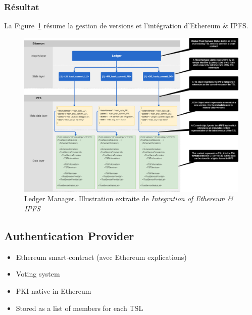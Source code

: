 \documentclass{tnreport}
\begin{document}
\subsubsection{Résultat}

La Figure~\ref{fig:versioning} résume la gestion de versions et l'intégration d'Ethereum \& IPFS.

\clearpage

\begin{figure}[h]
	\centering
	\includegraphics[scale=0.35]{figures/versioning}
	\caption{Ledger Manager. Illustration extraite de \textit{Integration of Ethereum \& IPFS}~\cite{ipfs-ethereum}}
	\label{fig:versioning}
\end{figure}

\subsection{Authentication Provider}
\label{sec:authentication}

\iffalse
\begin{itemize}
	\item Ethereum smart-contract (avec Ethereum explications)
	\item Voting system
	\item PKI native in Ethereum
	\item Stored as a list of members for each TSL
\end{itemize}
\end{document}
